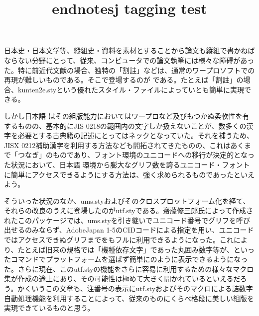 \documentclass{article}
\title{endnotesj tagging test}
\begin{document}
日本史・日本文学等、縦組史・資料を素材とすることから論文も縦組で書かねばならない分野にとって、従来、コンピュータでの論文執筆には様々な障碍があった。特に前近代文献の場合、独特の「割註」などは、通常のワープロソフトでの再現が難しいものである。そこで登場するのが\LaTeXe{} である。たとえば「割註」の場合、kunten2e.styという優れたスタイル・ファイルによっていとも簡単に実現できる。

しかし日本語\LaTeXe{} はその組版能力においてはワープロなど及びもつかぬ柔軟性を有するものの、基本的にJIS 0218の範囲内の文字しか扱えないことが、数多くの漢字を必要とする古典籍の記述にとってはネックとなっていた。それを補うため、JISX 0212補助漢字を利用する方法なども開拓されてきたものの、これはあくまで「つなぎ」のものであり、フォント環境のユニコードへの移行が決定的となった状況において、日本語\LaTeXe{} 環境から膨大なグリフ数を誇るユニコード・フォントに簡単にアクセスできるようにする方法は、強く求められるものであったといえよう。

そういった状況のなか、ums.styおよびそのクロスプロットフォーム化を経て、それらの改良のうえに登場したのがutf.styである。齋藤修三郎氏によって作成されたこのパッケージでは、ums.styを引き継いでユニコード番号でグリフを呼び出せるのみならず、AdobeJapan 1-5のCIDコードによる指定を用い、ユニコードではアクセスできぬグリフまでをもフルに利用できるようになった。これにより、たとえば旧来の規格では「機種依存文字」であった丸囲み数字等が、といったコマンドでプラットフォームを選ばず簡単にのように表示できるようになった。さらに現在、このutf.styの機能をさらに容易に利用するための様々なマクロ集が作成の途上にあり、その可能性は極めて大きく開かれているといえるだろう。かくいうこの文章も、注番号の表示にutf.styおよびそのマクロによる詰数字自動処理機能を利用することによって、従来のものにくらべ格段に美しい組版を実現できているものと思う。

\theendnotes
\end{document}
